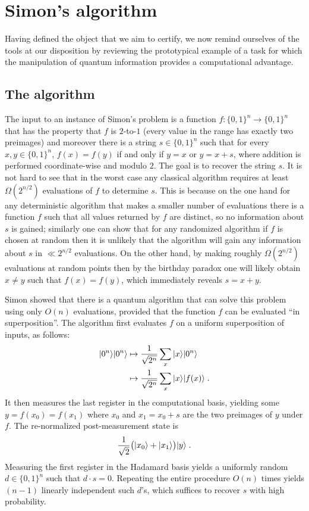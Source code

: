 \section{Simon's algorithm}

Having defined the object that we aim to certify, we now remind ourselves of the tools at our disposition by reviewing the prototypical example of a task for which the manipulation of quantum information provides  a computational advantage.

\subsection{The algorithm}
\label{sec:simon-algorithm}

The input to an instance of Simon's problem is a function $f:\{0,1\}^n\to \{0,1\}^n$ that has the property that $f$ is $2$-to-$1$ (every value in the range has exactly two preimages) and moreover there is a string $s\in\{0,1\}^n$ such that for every $x,y\in\{0,1\}^n$, $f(x)=f(y)$ if and only if $y=x$ or $y=x+ s$, where addition is performed coordinate-wise and modulo $2$. The goal is to recover the string $s$. It is not hard to see that in the worst case any classical algorithm requires at least $\Omega(2^{n/2})$ evaluations of $f$ to determine $s$. This is because on the one hand for any deterministic algorithm that makes a smaller number of evaluations there is a function $f$ such that all values returned by $f$ are distinct, so no information about $s$ is gained; similarly one can show that for any randomized algorithm if $f$ is chosen at random then it is unlikely that the algorithm will gain any information about $s$ in $\ll 2^{n/2}$ evaluations. On the other hand, by making roughly $\Omega(2^{n/2})$ evaluations at random points then by the birthday paradox one will likely obtain $x\neq y$ such that $f(x)=f(y)$, which immediately reveals $s=x+ y$. 

Simon showed that there is a quantum algorithm that can solve this problem using only $O(n)$ evaluations, provided that the function $f$ can be evaluated ``in superposition''. The algorithm first evaluates $f$ on a uniform superposition of inputs, as follows:
\begin{align*}
|0^n\rangle|0^n\rangle & \mapsto \frac{1}{\sqrt{2^n}}\sum_x |x\rangle |0^n\rangle\notag\\
&\mapsto  \frac{1}{\sqrt{2^n}} \sum_x |x\rangle |f(x)\rangle\notag\;.
\end{align*}
It then measures the last register in the computational basis, yielding some $y=f(x_0)=f(x_1)$ where $x_0$ and $x_1 = x_0+ s$ are the two preimages of $y$ under $f$. The re-normalized post-measurement state is
\begin{equation}
 \frac{1}{\sqrt{2}}\big(|x_0\rangle + |x_1\rangle\big) |y\rangle\;. \label{eq:simon-1}
\end{equation}
Measuring the first register in the Hadamard basis yields a uniformly random $d\in\{0,1\}^n$ such that $d\cdot s = 0$. Repeating the entire procedure $O(n)$ times yields $(n-1)$ linearly independent such $d$'s, which suffices to recover $s$ with high probability. 


